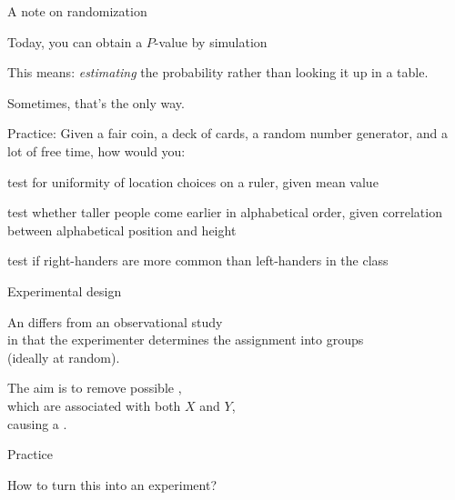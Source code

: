 \begin{frame}{A note on randomization}

    Today, you can  obtain a $P$-value by \alert{simulation}
    \vspace{2em}

    This means: \emph{estimating} the probability rather than looking it up in a table.
    \vspace{2em}
    
    Sometimes, that's the \alert{only way}.

\end{frame}


\begin{frame}{Practice:}
    Given a \alert{fair coin}, a \alert{deck of cards}, a \alert{random number generator}, and a lot of free time, how would you:

    test for uniformity of location choices on a ruler, given mean value

    test whether taller people come earlier in alphabetical order, given correlation between alphabetical position and height

    test if right-handers are more common than left-handers in the class

\end{frame}

\begin{frame}{Experimental design}

    An  differs from an \alert{observational study} \\
    in that the experimenter determines the assignment into groups\\
    (ideally at random).

    \vspace{2em}

    The aim is to remove possible ,\\
    which are associated with both $X$ and $Y$, \\
    causing a .

    \vspace{2em}

\end{frame}

\begin{frame}{Practice}

    How to turn this into an experiment?

\end{frame}


